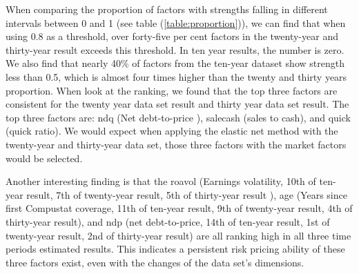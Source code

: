 When comparing the proportion of factors with strengths falling in different intervals between 0 and 1 (see table (\ref{table:proportion})), we can find that when using 0.8 as a threshold, over forty-five per cent factors in the twenty-year and thirty-year result exceeds this threshold.
In ten year results, the number is zero.
We also find that nearly 40\% of factors from the ten-year dataset show strength less than 0.5, which is almost four times higher than the twenty and thirty years proportion.
When look at the ranking, we found that the top three factors are consistent for the twenty year data set result and thirty year data set result.
The top three factors are: ndq (Net debt-to-price ), salecash (sales to cash), and quick (quick ratio).
We would expect when applying the elastic net method with the twenty-year and thirty-year data set, those three factors with the market factors would be selected.

Another interesting finding is that the roavol (Earnings volatility, 10th of ten-year result, 7th of twenty-year result, 5th of thirty-year result ), age (Years since first Compustat coverage, 11th of ten-year result, 9th of twenty-year result, 4th of thirty-year result), and ndp (net debt-to-price, 14th of ten-year result, 1st of twenty-year result, 2nd of thirty-year result) are all ranking high  in all three time periods estimated results.
This indicates a persistent risk pricing ability of these three factors exist, even with the changes of the data set's dimensions.

